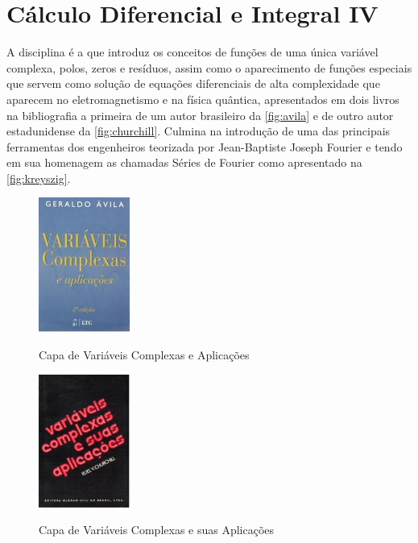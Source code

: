\documentclass[
	12pt,				%
	openright,			%
	oneside,			%
	a4paper,			%
	english,			%
	french,				%
	spanish,			%
	brazil				%
	]{abntex2}
\begin{document}
\section{Cálculo Diferencial e Integral IV}\label{sec:cdi4}
A disciplina é a que introduz os conceitos de funções de uma única variável complexa, polos, zeros e resíduos, assim como o aparecimento de funções especiais que servem como solução de equações diferenciais de alta complexidade que aparecem no eletromagnetismo e na física quântica, apresentados em dois livros na bibliografia a primeira de um autor brasileiro da \autoref{fig:avila} e de outro autor estadunidense da \autoref{fig:churchill}. Culmina na introdução de uma das principais ferramentas dos engenheiros teorizada por Jean-Baptiste Joseph Fourier e tendo em sua homenagem as chamadas Séries de Fourier como apresentado na \autoref{fig:kreyszig}.
\begin{figure}[!htb]
	\caption{Capa de Variáveis Complexas e Aplicações}
	\centering
	\includegraphics[width=3cm]{avila.jpg}
	\label{fig:avila}
\end{figure}
\begin{figure}[!htb]
	\caption{Capa de Variáveis Complexas e suas Aplicações}
	\centering
	\includegraphics[width=3cm]{churchill.jpg}
	\label{fig:churchill}
\end{figure}
\end{document}
